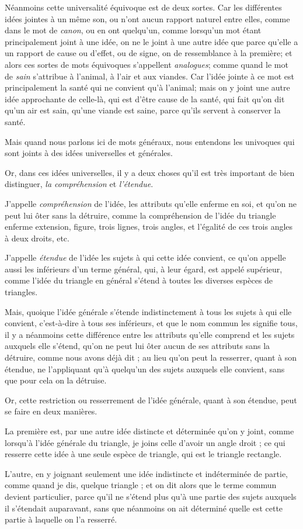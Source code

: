 Néanmoins cette universalité équivoque est de deux sortes. Car les différentes idées jointes à un même son, ou n'ont aucun rapport naturel entre elles, comme dans le mot de \emph{canon}, ou en ont quelqu'un, comme lorsqu'un mot étant principalement joint à une idée, on ne le joint à une autre idée que parce qu'elle a un rapport de cause ou d'effet, ou de signe, on de ressemblance à la première; et alors ces sortes de mots équivoques s'appellent \emph{analogues}; comme quand le mot de \emph{sain} s'attribue à l'animal, à l'air et aux viandes. Car l'idée jointe à ce mot est principalement la santé qui ne convient qu'à l'animal; mais on y joint une autre idée approchante de celle-là, qui est d'être cause de la santé, qui fait qu'on dit qu'un air est sain, qu'une viande est saine, parce qu'ils servent à conserver la santé.

Mais quand nous parlons ici de mots généraux, nous entendons les univoques qui sont joints à des idées universelles et générales.

Or, dans ces idées universelles, il y a deux choses qu'il est très important de bien distinguer, \emph{la compréhension} et \emph{l'étendue}.

J'appelle \emph{compréhension} de l'idée, les attributs qu'elle enferme en soi, et qu'on ne peut lui ôter sans la détruire, comme la compréhension de l'idée du triangle enferme extension, figure, trois lignes, trois angles, et l'égalité de ces trois angles à deux droits, etc.

J'appelle \emph{étendue} de l'idée les sujets à qui cette idée convient, ce qu'on appelle aussi les inférieurs d'un terme général, qui, à leur égard, est appelé supérieur, comme l'idée du triangle en général s'étend à toutes les diverses espèces de triangles.

Mais, quoique l'idée générale s'étende indistinctement à tous les sujets à qui elle convient, c'est-à-dire à tous ses inférieurs, et que le nom commun les signifie tous, il y a néanmoins cette différence entre les attributs qu'elle comprend et les sujets auxquels elle s'étend, qu'on ne peut lui ôter aucun de ses attributs sans la détruire, comme nous avons déjà dit ; au lieu qu'on peut la resserrer, quant à son étendue, ne l'appliquant qu'à quelqu'un des sujets auxquels elle convient, sans que pour cela on la détruise.

Or, cette restriction ou resserrement de l'idée générale, quant à son étendue, peut se faire en deux manières.

La première est, par une autre idée distincte et déterminée qu'on y joint, comme lorsqu'à l'idée générale du triangle, je joins celle d'avoir un angle droit ; ce qui resserre cette idée à une seule espèce de triangle, qui est le triangle rectangle.

L'autre, en y joignant seulement une idée indistincte et indéterminée de partie, comme quand je dis, quelque triangle ; et on dit alors que le terme commun devient particulier, parce qu'il ne s'étend plus qu'à une partie des sujets auxquels il s'étendait auparavant, sans que néanmoins on ait déterminé quelle est cette partie à laquelle on l'a resserré.

